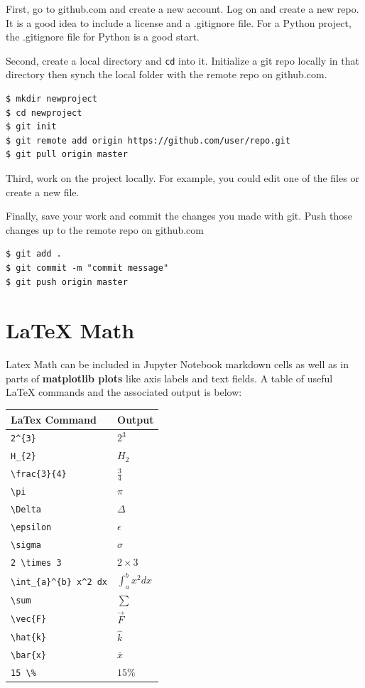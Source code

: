 \documentclass{book}
\begin{document}
First, go to github.com and create a new account. Log on and create a
new repo. It is a good idea to include a license and a .gitignore file.
For a Python project, the .gitignore file for Python is a good start.

Second, create a local directory and \lstinline!cd! into it. Initialize
a git repo locally in that directory then synch the local folder with
the remote repo on github.com.

\begin{lstlisting}
$ mkdir newproject
$ cd newproject
$ git init
$ git remote add origin https://github.com/user/repo.git
$ git pull origin master
\end{lstlisting}

Third, work on the project locally. For example, you could edit one of
the files or create a new file.

Finally, save your work and commit the changes you made with git. Push
those changes up to the remote repo on github.com

\begin{lstlisting}
$ git add .
$ git commit -m "commit message"
$ git push origin master
\end{lstlisting}

    \section{LaTeX Math}\label{latex-math}

    Latex Math can be included in Jupyter Notebook markdown cells as well as
in parts of \textbf{matplotlib plots} like axis labels and text fields.
A table of useful LaTeX commands and the associated output is below:

\begin{longtable}[]{@{}ll@{}}
\toprule
LaTex Command & Output\tabularnewline
\midrule
\endhead
\lstinline!2^{3}! & \(2^{3}\)\tabularnewline
\lstinline!H_{2}! & \(H_{2}\)\tabularnewline
\lstinline!\frac{3}{4}! & \(\frac{3}{4}\)\tabularnewline
\lstinline!\pi! & \(\pi\)\tabularnewline
\lstinline!\Delta! & \(\Delta\)\tabularnewline
\lstinline!\epsilon! & \(\epsilon\)\tabularnewline
\lstinline!\sigma! & \(\sigma\)\tabularnewline
\lstinline!2 \times 3! & \(2 \times 3\)\tabularnewline
\lstinline!\int_{a}^{b} x^2 dx! & \(\int_{a}^{b} x^2 dx\)\tabularnewline
\lstinline!\sum! & \(\sum\)\tabularnewline
\lstinline!\vec{F}! & \(\vec{F}\)\tabularnewline
\lstinline!\hat{k}! & \(\hat{k}\)\tabularnewline
\lstinline!\bar{x}! & \(\bar{x}\)\tabularnewline
\lstinline!15 \%! & \(15 \%\)\tabularnewline
\bottomrule
\end{longtable}
\end{document}
